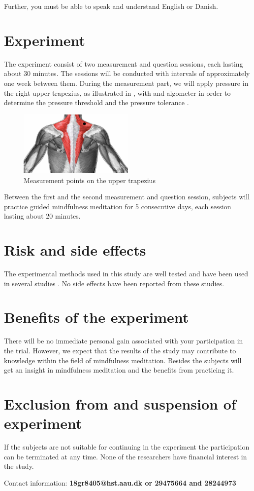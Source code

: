 Further, you must be able to speak and understand English or Danish.
 
\section*{Experiment}
The experiment consist of two measurement and question sessions, each lasting about 30 minutes. The sessions will be conducted with intervals of approximately one week between them. During the measurement part, we will apply pressure in the right upper trapezius, as illustrated in , with and algometer in order to determine the pressure threshold and the pressure tolerance . 

\begin{figure}[H]
	\includegraphics[width=0.5\textwidth]{figures/trapezius.jpg}
	\caption{Measurement points on the upper trapezius}
	\label{fig:trapezius} 
\end{figure}

Between the first and the second measurement and question session, subjects will practice guided mindfulness meditation for 5 consecutive days, each session lasting about 20 minutes. 

\section*{Risk and side effects}
The experimental methods used in this study are well tested and have been used in several studies . No side effects have been reported from these studies.

\section*{Benefits of the experiment}
There will be no immediate personal gain associated with your participation in the trial. However, we expect that the results of the study may contribute to knowledge within the field of mindfulness meditation. Besides the subjects will get an insight in mindfulness meditation and the benefits from practicing it.

\section*{Exclusion from and suspension of experiment}
If the subjects are not suitable for continuing in the experiment the participation can be terminated at any time.
None of the researchers have financial interest in the study.

Contact information:
\textbf{18gr8405@hst.aau.dk or 29475664 and 28244973
}